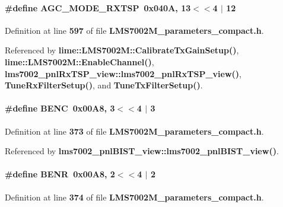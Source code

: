 \paragraph[{A\+G\+C\+\_\+\+M\+O\+D\+E\+\_\+\+R\+X\+T\+SP}]{\setlength{\rightskip}{0pt plus 5cm}\#define A\+G\+C\+\_\+\+M\+O\+D\+E\+\_\+\+R\+X\+T\+SP~0x040\+A, 13$<$$<$4 $\vert$  12}\label{LMS7002M__parameters__compact_8h_a57f269b16902e2a35c6e05d011ef9e8d}


Definition at line {\bf 597} of file {\bf L\+M\+S7002\+M\+\_\+parameters\+\_\+compact.\+h}.



Referenced by {\bf lime\+::\+L\+M\+S7002\+M\+::\+Calibrate\+Tx\+Gain\+Setup()}, {\bf lime\+::\+L\+M\+S7002\+M\+::\+Enable\+Channel()}, {\bf lms7002\+\_\+pnl\+Rx\+T\+S\+P\+\_\+view\+::lms7002\+\_\+pnl\+Rx\+T\+S\+P\+\_\+view()}, {\bf Tune\+Rx\+Filter\+Setup()}, and {\bf Tune\+Tx\+Filter\+Setup()}.

\paragraph[{B\+E\+NC}]{\setlength{\rightskip}{0pt plus 5cm}\#define B\+E\+NC~0x00\+A8, 3$<$$<$4 $\vert$  3}\label{LMS7002M__parameters__compact_8h_a234d32f8468cad5b9c15e3c9a0b04a22}


Definition at line {\bf 373} of file {\bf L\+M\+S7002\+M\+\_\+parameters\+\_\+compact.\+h}.



Referenced by {\bf lms7002\+\_\+pnl\+B\+I\+S\+T\+\_\+view\+::lms7002\+\_\+pnl\+B\+I\+S\+T\+\_\+view()}.

\paragraph[{B\+E\+NR}]{\setlength{\rightskip}{0pt plus 5cm}\#define B\+E\+NR~0x00\+A8, 2$<$$<$4 $\vert$  2}\label{LMS7002M__parameters__compact_8h_ad79ea36290708494a3c66e65437c4167}


Definition at line {\bf 374} of file {\bf L\+M\+S7002\+M\+\_\+parameters\+\_\+compact.\+h}.



